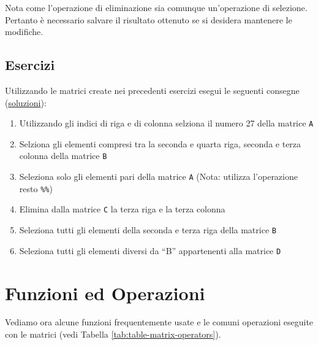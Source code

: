 \documentclass[
]{book}
\providecommand{\tightlist}{%
  \setlength{\itemsep}{0pt}\setlength{\parskip}{0pt}}
\begin{document}
Nota come l'operazione di eliminazione sia comunque un'operazione di selezione. Pertanto è necessario salvare il risultato ottenuto se si desidera mantenere le modifiche.

\hypertarget{esercizi-7}{%
\subsection*{Esercizi}\label{esercizi-7}}

Utilizzando le matrici create nei precedenti esercizi esegui le seguenti consegne (\href{https://github.com/psicostat/Introduction2R/blob/master/exercises/chapter-09.R}{soluzioni}):

\begin{enumerate}
\def\labelenumi{\arabic{enumi}.}
\tightlist
\item
  Utilizzando gli indici di riga e di colonna selziona il numero 27 della matrice \texttt{A}
\item
  Selziona gli elementi compresi tra la seconda e quarta riga, seconda e terza colonna della matrice \texttt{B}
\item
  Seleziona solo gli elementi pari della matrice \texttt{A} (Nota: utilizza l'operazione resto \texttt{\%\%})
\item
  Elimina dalla matrice \texttt{C} la terza riga e la terza colonna
\item
  Seleziona tutti gli elementi della seconda e terza riga della matrice \texttt{B}
\item
  Seleziona tutti gli elementi diversi da ``B'' appartenenti alla matrice \texttt{D}
\end{enumerate}

\hypertarget{funzioni-ed-operazioni}{%
\section{Funzioni ed Operazioni}\label{funzioni-ed-operazioni}}

Vediamo ora alcune funzioni frequentemente usate e le comuni operazioni eseguite con le matrici (vedi Tabella \ref{tab:table-matrix-operators}).
\end{document}

